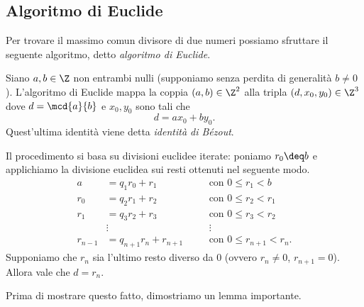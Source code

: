 \subsection{Algoritmo di Euclide}

Per trovare il massimo comun divisore di due numeri possiamo sfruttare il seguente algoritmo, detto \emph{algoritmo di Euclide}.

Siano $a, b \in \Z$ non entrambi nulli (supponiamo senza perdita di generalità $b \neq 0$). L'algoritmo di Euclide mappa la coppia $(a, b) \in \Z^2$ alla tripla $(d, x_0, y_0) \in \Z^3$ dove $d = \mcd{a}{b}$ e $x_0, y_0$ sono tali che \begin{equation}
    d = ax_0 + by_0. \label{eq:bézout}
\end{equation} Quest'ultima identità viene detta \emph{identità di Bézout}.

Il procedimento si basa su divisioni euclidee iterate: poniamo $r_0 \deq b$ e applichiamo la divisione euclidea sui resti ottenuti nel seguente modo.
\begin{align*}
    a &= q_1r_0 + r_1 \quad &&\text{con } 0 \leq r_1 < b \\
    r_0 &= q_2r_1 + r_2 \quad &&\text{con } 0 \leq r_2 < r_1 \\
    r_1 &= q_3r_2 + r_3 \quad &&\text{con } 0 \leq r_3 < r_2 \\
    &\vdots &&\vdots\\
    r_{n-1} &= q_{n+1}r_n + r_{n+1} \quad &&\text{con } 0 \leq r_{n+1} < r_n.
\end{align*}
Supponiamo che $r_n$ sia l'ultimo resto diverso da $0$ (ovvero $r_n \neq 0$, $r_{n+1} = 0$). Allora vale che $d = r_n$.

Prima di mostrare questo fatto, dimostriamo un lemma importante.

